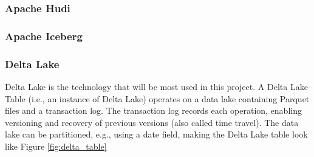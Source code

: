 \subsubsection*{Apache Hudi}
\subsubsection*{Apache Iceberg}
\subsubsection*{Delta Lake}




Delta Lake is the technology that will be most used in this project. A Delta Lake Table (i.e., an instance of Delta Lake) operates on a data lake containing Parquet files and a transaction log. The transaction log records each operation, enabling versioning and recovery of previous versions (also called time travel). The data lake can be partitioned, e.g., using a date field, making the Delta Lake table look like Figure \ref{fig:delta_table}



